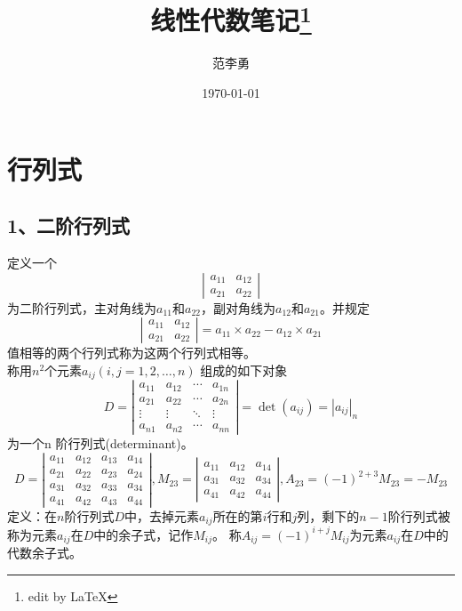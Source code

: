 \documentclass[12pt]{book}%
\title{\heiti 线性代数笔记\footnote{edit by \LaTeX}}
\author{\kaishu 范李勇}
\date{\today}
\begin{document}
\maketitle
\chapter{行列式}
\section{ 1、二阶行列式}
定义一个
$$
\left|\begin{array}{cc} a_{11} & a_{12} \\
a_{21} & a_{22} \end{array}\right|
$$
为二阶行列式，主对角线为$a_{11}$和$a_{22}$，副对角线为$a_{12}$和$a_{21}$。并规定
$$
\left|\begin{array}{cc} a_{11} & a_{12} \\
a_{21} & a_{22} \end{array}\right|=a_{11}\times a_{22}-a_{12}\times a_{21}
$$
值相等的两个行列式称为这两个行列式相等。\\
称用$n^2$个元素$a_{ij}  (i,j =1,2,…,n)$ 组成的如下对象
$$
D=\left|
\begin{array}{cccc} 
    a_{11} & a_{12} & \cdots & a_{1n} \\ 
    a_{21} & a_{22} & \cdots & a_{2n} \\ 
    \vdots & \vdots & \ddots & \vdots \\
    a_{n1} & a_{n2} & \cdots & a_{nn} 
\end{array}
\right|=\det(a_{ij})=|a_{ij}|_{n}
$$
为一个n 阶行列式(determinant)。
$$
D=\left|
\begin{array}{cccc} 
    a_{11} & a_{12} & a_{13} & a_{14} \\
    a_{21} & a_{22} & a_{23} & a_{24} \\
    a_{31} & a_{32} & a_{33} & a_{34} \\
    a_{41} & a_{42} & a_{43} & a_{44} 
\end{array}\right|,
M_{23}=\left|
\begin{array}{ccc} 
    a_{11} & a_{12} & a_{14} \\
    a_{31} & a_{32} & a_{34} \\
    a_{41} & a_{42} & a_{44} 
\end{array}\right|,A_{23}=(-1)^{2+3}M_{23}=-M_{23}
$$
定义：在$n$阶行列式$D$中，去掉元素$a_{ij}$所在的第$i$行和$j$列，剩下的$n-1$阶行列式被称为元素$a_{ij}$在$D$中的余子式，记作$M_{ij}$。
称$A_{ij}=(-1)^{i+j}M_{ij}$为元素$a_{ij}$在$D$中的代数余子式。
\end{document}
